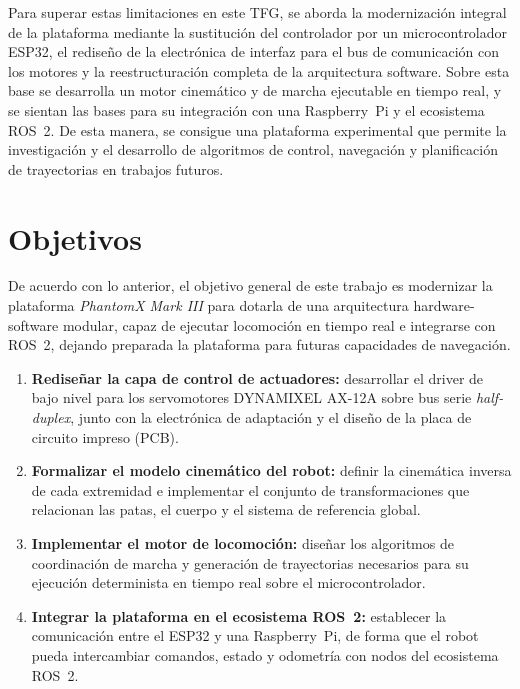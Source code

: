 Para superar estas limitaciones en este TFG, se aborda la modernización integral de la plataforma mediante la sustitución del controlador por un microcontrolador ESP32, el rediseño de la electrónica de interfaz para el bus de comunicación con los motores y la reestructuración completa de la arquitectura software. Sobre esta base se desarrolla un motor cinemático y de marcha ejecutable en tiempo real, y se sientan las bases para su integración con una Raspberry~Pi y el ecosistema ROS~2. De esta manera, se consigue una plataforma experimental que permite la investigación y el desarrollo de algoritmos de control, navegación y planificación de trayectorias en trabajos futuros.


\section{Objetivos} \label{sec:objetivos}

De acuerdo con lo anterior, el objetivo general de este trabajo es modernizar la plataforma \textit{PhantomX Mark III} para dotarla de una arquitectura hardware-software modular, capaz de ejecutar locomoción en tiempo real e integrarse con ROS~2, dejando preparada la plataforma para futuras capacidades de navegación.

\begin{enumerate}

    \item \textbf{Rediseñar la capa de control de actuadores:} desarrollar el driver de bajo nivel para los servomotores DYNAMIXEL AX-12A sobre bus serie \textit{half-duplex}, junto con la electrónica de adaptación y el diseño de la placa de circuito impreso (PCB).

    \item \textbf{Formalizar el modelo cinemático del robot:} definir la cinemática inversa de cada extremidad e implementar el conjunto de transformaciones que relacionan las patas, el cuerpo y el sistema de referencia global.

    \item \textbf{Implementar el motor de locomoción:} diseñar los algoritmos de coordinación de marcha y generación de trayectorias necesarios para su ejecución determinista en tiempo real sobre el microcontrolador.

    \item \textbf{Integrar la plataforma en el ecosistema ROS~2:} establecer la comunicación entre el ESP32 y una Raspberry~Pi, de forma que el robot pueda intercambiar comandos, estado y odometría con nodos del ecosistema ROS~2.

\end{enumerate}

